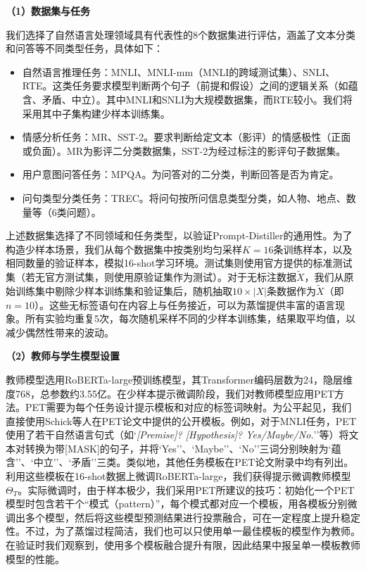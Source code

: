 \documentclass[../main.tex]{subfiles}
\begin{document}
\vspace{1em}
\textbf{（1）数据集与任务}
\vspace{0.5em}

我们选择了自然语言处理领域具有代表性的8个数据集进行评估，涵盖了文本分类和问答等不同类型任务，具体如下：
\begin{itemize}
	\item 自然语言推理任务：MNLI、MNLI-mm（MNLI的跨域测试集）、SNLI、RTE。这类任务要求模型判断两个句子（前提和假设）之间的逻辑关系（如蕴含、矛盾、中立）。其中MNLI和SNLI为大规模数据集，而RTE较小。我们将采用其中子集构建少样本训练集。
	\item 情感分析任务：MR、SST-2。要求判断给定文本（影评）的情感极性（正面或负面）。MR为影评二分类数据集，SST-2为经过标注的影评句子数据集。
	\item 用户意图问答任务：MPQA。为问答对的二分类，判断回答是否为肯定。
	\item 问句类型分类任务：TREC。将问句按所问信息类型分类，如人物、地点、数量等（6类问题）。
\end{itemize}
上述数据集选择了不同领域和任务类型，以验证Prompt-Distiller的通用性。为了构造少样本场景，我们从每个数据集中按类别均匀采样$K=16$条训练样本，以及相同数量的验证样本，模拟16-shot学习环境。测试集则使用官方提供的标准测试集（若无官方测试集，则使用原验证集作为测试）。对于无标注数据$\tilde{X}$，我们从原始训练集中剔除少样本训练集和验证集后，随机抽取$10 \times |X|$条数据作为$\tilde{X}$（即$n=10$）。这些无标签语句在内容上与任务接近，可以为蒸馏提供丰富的语言现象。所有实验均重复5次，每次随机采样不同的少样本训练集，结果取平均值，以减少偶然性带来的波动。

\vspace{1em}
\textbf{（2）教师与学生模型设置}
\vspace{0.5em}

教师模型选用RoBERTa-large预训练模型，其Transformer编码层数为24，隐层维度768，总参数约3.55亿。在少样本提示微调阶段，我们对教师模型应用PET方法。PET需要为每个任务设计提示模板和对应的标签词映射。为公平起见，我们直接使用Schick等人在PET论文中提供的公开模板。例如，对于MNLI任务，PET使用了若干自然语言句式（如`\textit{[Premise]? [Hypothesis]? Yes/Maybe/No.}''等）将文本对转换为带[MASK]的句子，并将`Yes''、`Maybe''、`No''三词分别映射为`蕴含''、`中立''、`矛盾''三类。类似地，其他任务模板在PET论文附录中均有列出。利用这些模板在16-shot数据上微调RoBERTa-large，我们获得提示微调教师模型$\Theta_T$。实际微调时，由于样本极少，我们采用PET所建议的技巧：初始化一个PET模型时包含若干个“模式（pattern）”，每个模式都对应一个模板，用各模板分别微调出多个模型，然后将这些模型预测结果进行投票融合，可在一定程度上提升稳定性。不过，为了蒸馏过程简洁，我们也可以只使用单一最佳模板的模型作为教师。在验证时我们观察到，使用多个模板融合提升有限，因此结果中报呈单一模板教师模型的性能。
\end{document}
